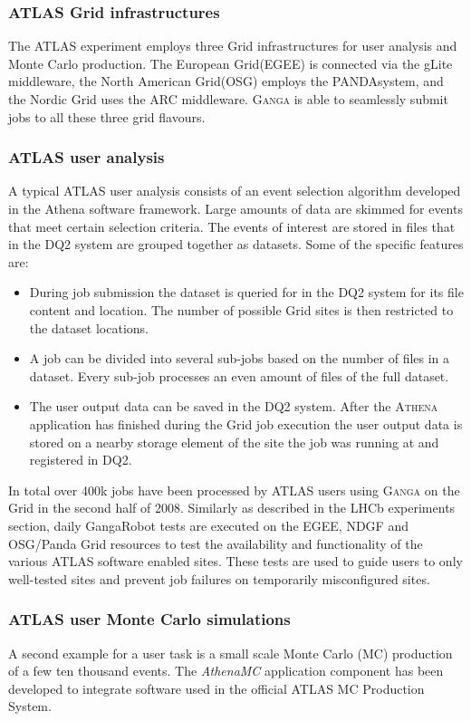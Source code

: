\documentclass{elsart}
\def\atlas {ATLAS\xspace}
\def\ganga {\textsc{Ganga}\xspace}
\def\athena {\textsc{Athena}\xspace}
\def\grid {Grid\xspace}
\def\panda{PANDA}
\begin{document}
\subsubsection{\atlas \grid infrastructures}

The \atlas experiment employs three \grid infrastructures for user
analysis and Monte Carlo production. The European \grid (EGEE) is
connected via the gLite middleware, the North American \grid (OSG)
employs the \panda system, and the Nordic \grid uses the ARC
middleware. \ganga is able to seamlessly submit jobs to all these three
grid flavours.

\subsubsection{\atlas user analysis}
A typical \atlas user analysis consists of an event selection algorithm
developed in the Athena software framework. Large amounts of data are skimmed
for events that meet certain selection criteria. The events of interest are
stored in files that in the DQ2 system are grouped together as datasets. Some
of the specific features are:
\begin{itemize}
\item During job submission the dataset is queried for in the DQ2 system for
  its file content and location.  The number of possible \grid sites is then
  restricted to the dataset locations.
\item A job can be divided into several sub-jobs based on the number of files
  in a dataset. Every sub-job processes an even amount of files of the full
  dataset.
\item The user output data can be saved in the DQ2 system. After the \athena
  application has finished during the \grid job execution the user output data
  is stored on a nearby storage element of the site the job was running at
  and registered in DQ2.
\end{itemize}

In total over 400k jobs have been processed by \atlas users
using \ganga on the Grid in the second half of 2008. Similarly as
described in the LHCb experiments section, daily GangaRobot tests are
executed on the EGEE, NDGF and OSG/Panda \grid resources to test the
availability and functionality of the various \atlas software enabled
sites. These tests are used to guide users to only well-tested sites and
prevent job failures on temporarily misconfigured sites.

\subsubsection{\atlas user Monte Carlo simulations}
A second example for a user task is a small scale Monte Carlo (MC) production
of a few ten thousand events. The \emph{AthenaMC} application component has
been developed to integrate software used in the official \atlas MC Production
System. %
\end{document}
